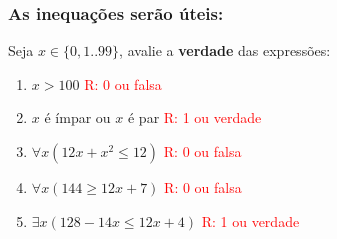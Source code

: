 \documentclass{beamer}
\begin{document}
\begin{frame}
\frametitle{As inequações serão úteis:}

\begin{exampleblock}
{Seja $x \in \{0,1..99\}$, avalie a \textbf{verdade} das expressões:}
\begin{enumerate}
  
  \item $ x > 100$ \hspace{1cm} \textcolor{red}{R: 0 ou falsa}
  
  \item $x$ é ímpar ou $x$ é par \hspace{1cm} \textcolor{red}{R: 1 ou verdade}

  
  \item $\forall x(12x + x^2 \le 12)$
\hspace{1cm} \textcolor{red}{R: 0 ou falsa}



  \item $\forall x(144 \ge 12x + 7)$ 
\hspace{1cm} \textcolor{red}{R: 0 ou falsa}

  \item $\exists x(128 - 14x \le 12x + 4)$ 
\hspace{1cm} \textcolor{red}{R: 1 ou verdade}
      
\end{enumerate}
\end{exampleblock}
\end{frame}
\end{document}
